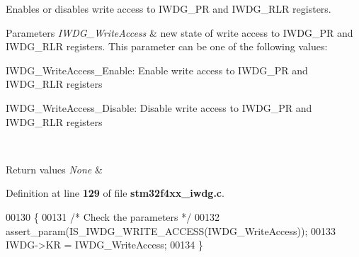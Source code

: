 Enables or disables write access to I\+W\+D\+G\+\_\+\+PR and I\+W\+D\+G\+\_\+\+R\+LR registers. 


\begin{DoxyParams}{Parameters}
{\em I\+W\+D\+G\+\_\+\+Write\+Access} & new state of write access to I\+W\+D\+G\+\_\+\+PR and I\+W\+D\+G\+\_\+\+R\+LR registers. This parameter can be one of the following values\+: \begin{DoxyItemize}
\item I\+W\+D\+G\+\_\+\+Write\+Access\+\_\+\+Enable\+: Enable write access to I\+W\+D\+G\+\_\+\+PR and I\+W\+D\+G\+\_\+\+R\+LR registers \item I\+W\+D\+G\+\_\+\+Write\+Access\+\_\+\+Disable\+: Disable write access to I\+W\+D\+G\+\_\+\+PR and I\+W\+D\+G\+\_\+\+R\+LR registers \end{DoxyItemize}
\\
\hline
\end{DoxyParams}

\begin{DoxyRetVals}{Return values}
{\em None} & \\
\hline
\end{DoxyRetVals}


Definition at line \textbf{ 129} of file \textbf{ stm32f4xx\+\_\+iwdg.\+c}.


\begin{DoxyCode}
00130 \{
00131   \textcolor{comment}{/* Check the parameters */}
00132   assert_param(IS_IWDG_WRITE_ACCESS(IWDG\_WriteAccess));
00133   IWDG->KR = IWDG\_WriteAccess;
00134 \}
\end{DoxyCode}
